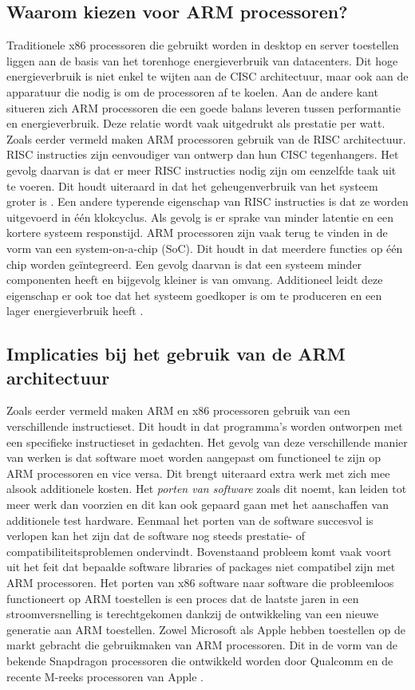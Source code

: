 \subsection{Waarom kiezen voor ARM processoren?}
Traditionele x86 processoren die gebruikt worden in desktop en server toestellen liggen aan de basis van het torenhoge energieverbruik van datacenters. Dit hoge energieverbruik is niet enkel te wijten aan de CISC architectuur, maar ook aan de apparatuur die nodig is om de processoren af te koelen. Aan de andere kant situeren zich ARM processoren die een goede balans leveren tussen performantie en energieverbruik. Deze relatie wordt vaak uitgedrukt als prestatie per watt. Zoals eerder vermeld maken ARM processoren gebruik van de RISC architectuur. RISC instructies zijn eenvoudiger van ontwerp dan hun CISC tegenhangers. Het gevolg daarvan is dat er meer RISC instructies nodig zijn om eenzelfde taak uit te voeren. Dit houdt uiteraard in dat het geheugenverbruik van het systeem groter is \autocite{Aroca2012}. Een andere typerende eigenschap van RISC instructies is dat ze worden uitgevoerd in één klokcyclus. Als gevolg is er sprake van minder latentie en een kortere systeem responstijd. ARM processoren zijn vaak terug te vinden in de vorm van een system-on-a-chip (SoC). Dit houdt in dat meerdere functies op één chip worden geïntegreerd. Een gevolg daarvan is dat een systeem minder componenten heeft en bijgevolg kleiner is van omvang. Additioneel leidt deze eigenschap er ook toe dat het systeem goedkoper is om te produceren en een lager energieverbruik heeft \autocite{Ravali2016}.

\subsection{Implicaties bij het gebruik van de ARM architectuur}
Zoals eerder vermeld maken ARM en x86 processoren gebruik van een verschillende instructieset. Dit houdt in dat programma’s worden ontworpen met een specifieke instructieset in gedachten. Het gevolg van deze verschillende manier van werken is dat software moet worden aangepast om functioneel te zijn op ARM processoren en vice versa. Dit brengt uiteraard extra werk met zich mee alsook additionele kosten. Het \textit{porten van software} zoals dit noemt, kan leiden tot meer werk dan voorzien en dit kan ook gepaard gaan met het aanschaffen van additionele test hardware. Eenmaal het porten van de software succesvol is verlopen kan het zijn dat de software nog steeds prestatie- of compatibiliteitsproblemen ondervindt. Bovenstaand probleem komt vaak voort uit het feit dat bepaalde software libraries of packages niet compatibel zijn met ARM processoren. Het porten van x86 software naar software die probleemloos functioneert op ARM toestellen is een proces dat de laatste jaren in een stroomversnelling is terechtgekomen dankzij de ontwikkeling van een nieuwe generatie aan ARM toestellen. Zowel Microsoft als Apple hebben toestellen op de markt gebracht die gebruikmaken van ARM processoren. Dit in de vorm van de bekende Snapdragon processoren die ontwikkeld worden door Qualcomm en de recente M-reeks processoren van Apple \autocite{Ford2021}.

